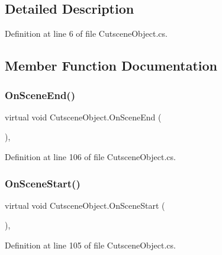 \subsection{Detailed Description}


Definition at line 6 of file Cutscene\+Object.\+cs.



\subsection{Member Function Documentation}
\mbox{\label{class_cutscene_object_a028a73ecec97660090c68080ab7939e3}} 
\subsubsection{\texorpdfstring{On\+Scene\+End()}{OnSceneEnd()}}
{\footnotesize\ttfamily virtual void Cutscene\+Object.\+On\+Scene\+End (\begin{DoxyParamCaption}{ }\end{DoxyParamCaption})\hspace{0.3cm}{\ttfamily [protected]}, {\ttfamily [virtual]}}



Definition at line 106 of file Cutscene\+Object.\+cs.

\mbox{\label{class_cutscene_object_a84f7ddae58243cd84fddf5a3d364cbfa}} 
\subsubsection{\texorpdfstring{On\+Scene\+Start()}{OnSceneStart()}}
{\footnotesize\ttfamily virtual void Cutscene\+Object.\+On\+Scene\+Start (\begin{DoxyParamCaption}{ }\end{DoxyParamCaption})\hspace{0.3cm}{\ttfamily [protected]}, {\ttfamily [virtual]}}



Definition at line 105 of file Cutscene\+Object.\+cs.

\mbox{\label{class_cutscene_object_a23bce7b06c88f20664e646e1e88855a5}} 
